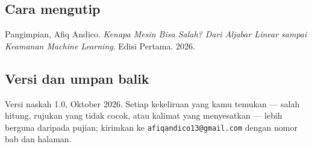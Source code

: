 \subsection*{Cara mengutip}
Pangimpian, Afiq Andico. \emph{Kenapa Mesin Bisa Salah? Dari Aljabar Linear sampai
Keamanan Machine Learning}. Edisi Pertama. 2026.

\subsection*{Versi dan umpan balik}
Versi naskah 1.0, Oktober 2026. Setiap kekeliruan yang kamu temukan --- salah hitung,
rujukan yang tidak cocok, atau kalimat yang menyesatkan --- lebih berguna daripada
pujian; kirimkan ke \texttt{afiqandico13@gmail.com} dengan nomor bab dan halaman.
